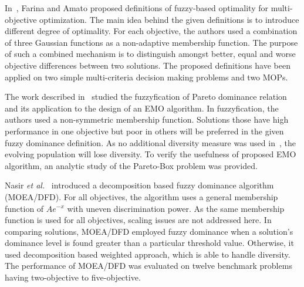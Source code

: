 \documentclass[review]{elsarticle}
\begin{document}
In~\citep{farina2004fuzzy}, Farina and Amato proposed definitions of fuzzy-based optimality for multi-objective optimization. The main idea behind the given definitions is to introduce different degree of optimality. 
For each objective, the authors used a combination of three Gaussian functions as a non-adaptive membership function. The purpose of such a combined mechanism is to distinguish amongst better, equal and worse objective differences between two solutions. The proposed definitions have been applied on two simple multi-criteria decision making problems and two MOPs. 







The work described in~\citep{koppen2005fuzzy} studied the fuzzyfication of Pareto dominance relation and its application to the design of an EMO algorithm. In fuzzyfication, the authors used a non-symmetric membership function. Solutions those have high performance in one objective but poor in others will be preferred in the given fuzzy dominance definition. As no additional diversity measure was used in~\citep{koppen2005fuzzy}, the evolving population will lose diversity.
To verify the usefulness of proposed EMO algorithm, an analytic study of the Pareto-Box problem was provided.

Nasir {\it et al.}~\citep{fuzzynasir} introduced a decomposition based fuzzy dominance algorithm (MOEA/DFD). For all objectives, the algorithm uses a general membership function of $Ae^{-x}$ with uneven discrimination power. As the same membership function is used for all objectives, scaling issues are not addressed here. In comparing solutions, MOEA/DFD employed fuzzy dominance when a solution's dominance level   is found greater than a particular threshold value. Otherwise, it used decomposition based weighted approach, which is able to handle diversity.
The performance of MOEA/DFD was evaluated on twelve benchmark problems having two-objective to five-objective.
\end{document}
